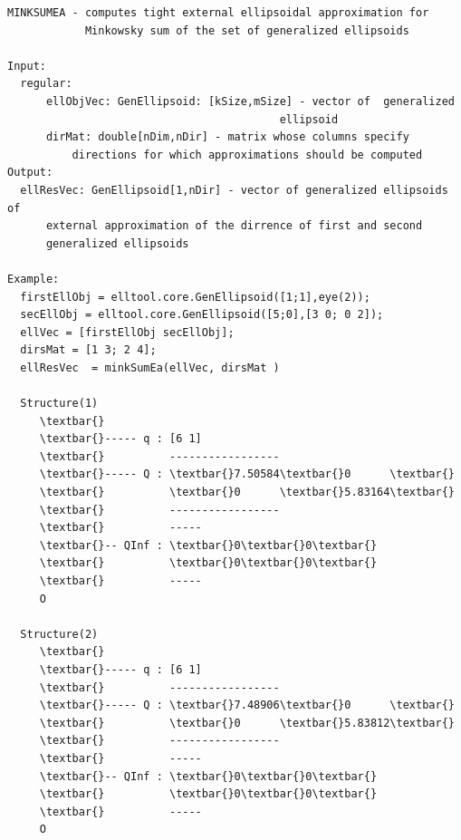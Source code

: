 \documentclass[letterpaper,10pt,english]{sphinxmanual}
\begin{document}
\begin{Verbatim}[commandchars=\\\{\}]
MINKSUMEA - computes tight external ellipsoidal approximation for
            Minkowsky sum of the set of generalized ellipsoids

Input:
  regular:
      ellObjVec: GenEllipsoid: [kSize,mSize] - vector of  generalized
                                          ellipsoid
      dirMat: double[nDim,nDir] - matrix whose columns specify
          directions for which approximations should be computed
Output:
  ellResVec: GenEllipsoid[1,nDir] - vector of generalized ellipsoids of
      external approximation of the dirrence of first and second
      generalized ellipsoids

Example:
  firstEllObj = elltool.core.GenEllipsoid([1;1],eye(2));
  secEllObj = elltool.core.GenEllipsoid([5;0],[3 0; 0 2]);
  ellVec = [firstEllObj secEllObj];
  dirsMat = [1 3; 2 4];
  ellResVec  = minkSumEa(ellVec, dirsMat )

  Structure(1)
     \textbar{}
     \textbar{}----- q : [6 1]
     \textbar{}          -----------------
     \textbar{}----- Q : \textbar{}7.50584\textbar{}0      \textbar{}
     \textbar{}          \textbar{}0      \textbar{}5.83164\textbar{}
     \textbar{}          -----------------
     \textbar{}          -----
     \textbar{}-- QInf : \textbar{}0\textbar{}0\textbar{}
     \textbar{}          \textbar{}0\textbar{}0\textbar{}
     \textbar{}          -----
     O

  Structure(2)
     \textbar{}
     \textbar{}----- q : [6 1]
     \textbar{}          -----------------
     \textbar{}----- Q : \textbar{}7.48906\textbar{}0      \textbar{}
     \textbar{}          \textbar{}0      \textbar{}5.83812\textbar{}
     \textbar{}          -----------------
     \textbar{}          -----
     \textbar{}-- QInf : \textbar{}0\textbar{}0\textbar{}
     \textbar{}          \textbar{}0\textbar{}0\textbar{}
     \textbar{}          -----
     O
\end{Verbatim}
\end{document}
